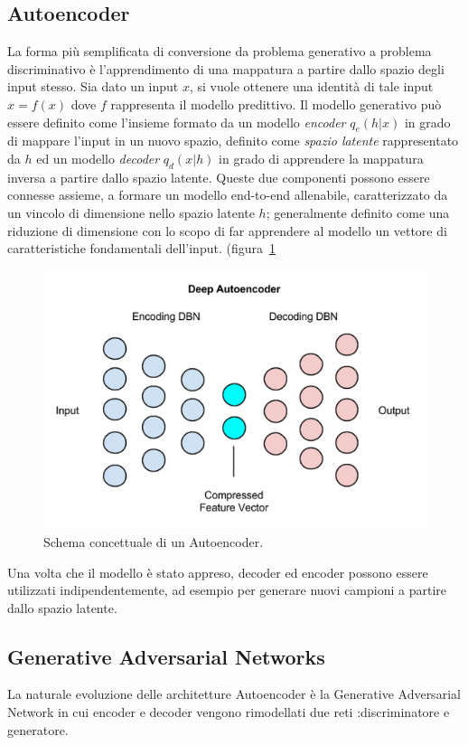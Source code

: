 \subsection{Autoencoder}
La forma più semplificata di conversione da problema generativo a problema discriminativo è l'apprendimento di una mappatura a partire dallo spazio degli input stesso. Sia dato un input $x$, si vuole ottenere una identità di tale input $x=f(x)$ dove $f$ rappresenta il modello predittivo. Il modello generativo può essere definito come l'insieme formato da un modello \textit{encoder} $q_e(h|x)$ in grado di mappare l'input in un nuovo spazio, definito come \textit{spazio latente} rappresentato da $h$ ed un modello \textit{decoder} $q_d(x|h)$ in grado di apprendere la mappatura inversa a partire dallo spazio latente.
Queste due componenti possono essere connesse assieme, a formare un modello end-to-end allenabile, caratterizzato da un vincolo di dimensione nello spazio latente $h$; generalmente definito come una riduzione di dimensione con lo scopo di far apprendere al modello un vettore di caratteristiche fondamentali dell'input. (figura~\ref{fig:aut}

\begin{figure}[!bp]
	\centering
	\includegraphics[width=\columnwidth]{figures/deep_autoencoder.png}
	\caption{Schema concettuale di un Autoencoder.  \label{fig:aut} }
\end{figure}

Una volta che il modello è stato appreso, decoder ed encoder possono essere utilizzati indipendentemente, ad esempio per generare nuovi campioni a partire dallo spazio latente.

\subsection{Generative Adversarial Networks}
La naturale evoluzione delle architetture Autoencoder è la Generative Adversarial Network in cui encoder e decoder vengono rimodellati due reti :discriminatore e generatore. 

